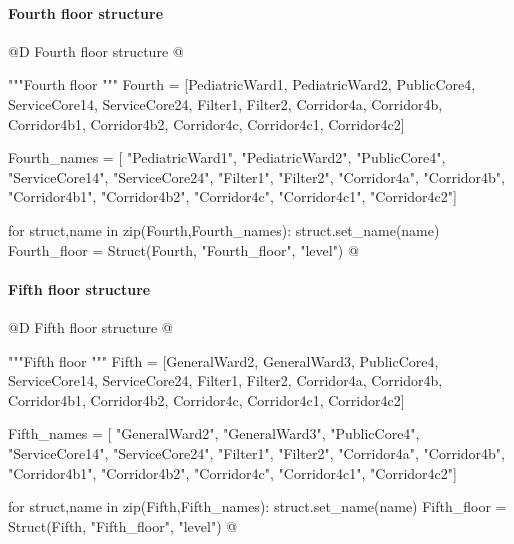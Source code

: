 \documentclass[11pt,oneside]{article}    %
\begin{document}
\paragraph{Fourth floor structure}
@D Fourth floor structure
@{"""Fourth floor """
Fourth = [PediatricWard1, PediatricWard2, PublicCore4, ServiceCore14, ServiceCore24,
    Filter1, Filter2, Corridor4a, Corridor4b, Corridor4b1, Corridor4b2, Corridor4c,
    Corridor4c1, Corridor4c2]

Fourth_names = [ "PediatricWard1", "PediatricWard2", "PublicCore4", "ServiceCore14", 
	"ServiceCore24", "Filter1", "Filter2", "Corridor4a", "Corridor4b", "Corridor4b1", 
	"Corridor4b2", "Corridor4c", "Corridor4c1", "Corridor4c2"]

for struct,name in zip(Fourth,Fourth_names): struct.set_name(name)
Fourth_floor = Struct(Fourth, "Fourth_floor", "level")
@}

\paragraph{Fifth floor structure}
@D Fifth floor structure
@{"""Fifth floor """
Fifth = [GeneralWard2, GeneralWard3, PublicCore4, ServiceCore14, ServiceCore24,
    Filter1, Filter2, Corridor4a, Corridor4b, Corridor4b1, Corridor4b2, Corridor4c,
    Corridor4c1, Corridor4c2]

Fifth_names = [ "GeneralWard2", "GeneralWard3", "PublicCore4", "ServiceCore14", 
	"ServiceCore24", "Filter1", "Filter2", "Corridor4a", "Corridor4b", "Corridor4b1", 
	"Corridor4b2", "Corridor4c", "Corridor4c1", "Corridor4c2"]

for struct,name in zip(Fifth,Fifth_names): struct.set_name(name)
Fifth_floor = Struct(Fifth, "Fifth_floor", "level")
@}
\end{document}
